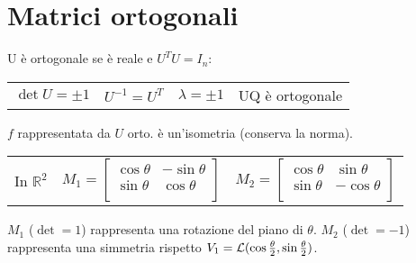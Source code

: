\section{Matrici ortogonali}

U è ortogonale se è reale e $U^TU=I_n$:

\begin{tabular}{llll}
	$\det U = \pm1$ & $U^{-1}=U^T$ & $\lambda = \pm 1$ & UQ è ortogonale
\end{tabular}

$f$ rappresentata da $U$ orto. è un'isometria (conserva la norma).

\begin{tabular}{lll}
	In $\mathbb{R}^2$ &
	$
		M_1 = \begin{bmatrix}
			\cos\theta & -\sin\theta \\
			\sin\theta & \cos\theta \\
		\end{bmatrix}
	$ &
	$
		M_2 = \begin{bmatrix}
			\cos\theta & \sin\theta \\
			\sin\theta & -\cos\theta \\
		\end{bmatrix}
	$
\end{tabular}

$M_1$ ($\det = 1$) rappresenta una rotazione del piano di $\theta$. $M_2$ ($\det = -1$) rappresenta una simmetria rispetto $V_1 = \mathcal{L}(\cos\frac{\theta}{2}, \sin\frac{\theta}{2})$.
